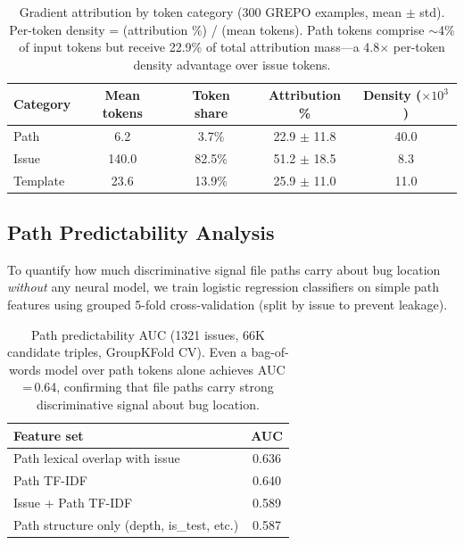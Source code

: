 \documentclass{article}
\begin{document}
\begin{table}[h]
\centering
\caption{Gradient attribution by token category (300 GREPO examples, mean $\pm$ std). Per-token density = (attribution \%) / (mean tokens). Path tokens comprise $\sim$4\% of input tokens but receive 22.9\% of total attribution mass---a 4.8$\times$ per-token density advantage over issue tokens.}
\label{tab:gradient_attribution}
\small
\begin{tabular}{lcccc}
\toprule
\textbf{Category} & \textbf{Mean tokens} & \textbf{Token share} & \textbf{Attribution \%} & \textbf{Density ($\times 10^3$)} \\
\midrule
Path & 6.2 & 3.7\% & 22.9 $\pm$ 11.8 & 40.0 \\
Issue & 140.0 & 82.5\% & 51.2 $\pm$ 18.5 & 8.3 \\
Template & 23.6 & 13.9\% & 25.9 $\pm$ 11.0 & 11.0 \\
\bottomrule
\end{tabular}
\end{table}

\subsection{Path Predictability Analysis}
\label{app:path_predictability}

To quantify how much discriminative signal file paths carry about bug location \emph{without} any neural model, we train logistic regression classifiers on simple path features using grouped 5-fold cross-validation (split by issue to prevent leakage).

\begin{table}[h]
\centering
\caption{Path predictability AUC (1321 issues, 66K candidate triples, GroupKFold CV). Even a bag-of-words model over path tokens alone achieves AUC\,=\,0.64, confirming that file paths carry strong discriminative signal about bug location.}
\label{tab:path_predictability}
\small
\begin{tabular}{lc}
\toprule
\textbf{Feature set} & \textbf{AUC} \\
\midrule
Path lexical overlap with issue & 0.636 \\
Path TF-IDF & 0.640 \\
Issue + Path TF-IDF & 0.589 \\
Path structure only (depth, is\_test, etc.) & 0.587 \\
\bottomrule
\end{tabular}
\end{table}
\end{document}
